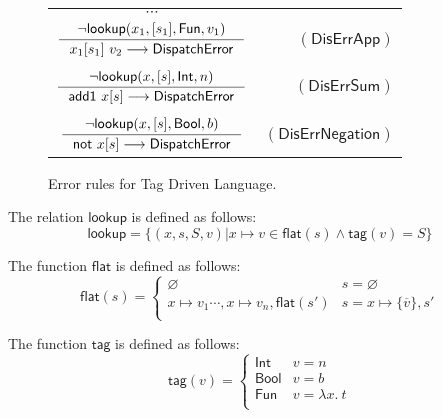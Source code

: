 \documentclass[preprint,authoryear,sort&compress,9pt,nocopyrightspace]{article}
\newcommand\rulename[1]{\mathsf{(#1)}}
\newcommand{\tto}{\longrightarrow}
\newcommand{\absST}[2]{\lambda #1. \ #2}
\newcommand{\negacion}[1]{\mathsf{not} \ #1}
\newcommand{\suma}[1]{\mathsf{add1} \ #1}
\newcommand{\lab}{\mathsf{tag}}
\newcommand{\boolt}{\mathsf{Bool}}
\newcommand{\intt}{\mathsf{Int}}
\newcommand{\funt}{\mathsf{Fun}}
\newcommand{\buscar}{\mathsf{lookup}}
\newcommand{\dispatcherror}{\mathsf{DispatchError}}
\newcommand{\semanticB}{Tag Driven Language}
\begin{document}
\begin{figure}[h]
\begin{small}
\begin{center}
\begin{tabular}{|c r|}
\hline
$\cdots$&\\
$\inference{ \neg \buscar(x_1, [s_1],\funt, v_1)}{x_1[s_1] \ v_2 \tto  \dispatcherror}$&$\rulename{DisErrApp}$\\
&\\
$\inference{\neg \buscar(x, [s], \intt, n)}{\suma{x[s]} \tto \dispatcherror}$&$\rulename{DisErrSum}$\\
&\\
$\inference{\neg \buscar(x, [s], \boolt, b)}{\negacion{x[s]} \tto \dispatcherror}$&$\rulename{DisErrNegation}$\\
\hline
\end{tabular}
\caption{Error rules for \semanticB.}
\label{tabla:errorRules2}
\end{center}
\end{small}
\end{figure}

\begin{definition}[$\buscar$]
\label{definition:tcs}
\mbox{}
The relation $\buscar$ is defined  as follows:
\[ \buscar  = \{(x, s, S, v)| x \mapsto v \in \mathsf{flat}(s) \wedge \lab(v) = S\}
\]
\end{definition}

\begin{definition}
\label{definition:tcs}
\mbox{}
The function $\mathsf{flat}$ is defined  as follows:
\[ \mathsf{flat}(s) = \begin{cases} 
      \varnothing & s =  \varnothing \\
      x \mapsto v_1 \cdots , x \mapsto v_n,\mathsf{flat} (s') & s = x \mapsto \{\overline{v}\}, s'\\
   \end{cases}
\]
\end{definition}

\begin{definition}[$\lab$]
\label{definition:tcs}
\mbox{}
The function $\lab$ is defined  as follows:
\[ \lab(v) = \begin{cases} 
      \intt & v = n \\
      \boolt & v = b \\
      \funt & v = \absST{x}{t}\\
   \end{cases}
\]
\end{definition}
\end{document}
